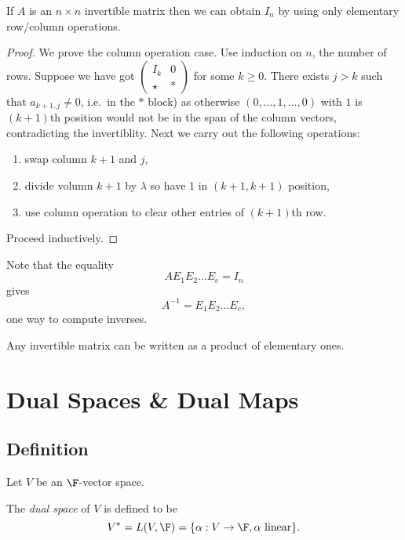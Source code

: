 \documentclass[a4paper]{article}
\theoremstyle{definition}
\begin{document}
\begin{lemma}
  If \(A\) is an \(n\times n\) invertible matrix then we can obtain \(I_n\) by using only elementary row/column operations.
\end{lemma}

\begin{proof}
  We prove the column operation case. Use induction on \(n\), the number of rows. Suppose we have got \(\begin{pmatrix} I_k & 0 \\ \star & \ast \end{pmatrix}\) for some \(k\geq 0\). There exists \(j>k\) such that \(a_{k+1,j}\neq 0\), i.e.\ in the \(\ast\) block) as otherwise \((0,\dots,1,\dots, 0)\) with \(1\) is \((k+1)\)th position would not be in the span of the column vectors, contradicting the invertiblity. Next we carry out the following operations:
  \begin{enumerate}
  \item swap column \(k+1\) and \(j\),
  \item divide volumn \(k+1\) by \(\lambda\) so have \(1\) in \((k+1,k+1)\) position,
  \item use column operation to clear other entries of \((k+1)\)th row.
  \end{enumerate}
  Proceed inductively.
\end{proof}

Note that the equality
\[
  AE_1E_2\dots E_c = I_n
\]
gives
\[
  A^{-1} = E_1E_2\dots E_c,
\]
one way to compute inverses.

\begin{proposition}
  Any invertible matrix can be written as a product of elementary ones.
\end{proposition}

\section{Dual Spaces \& Dual Maps}

\subsection{Definition}

Let \(V\) be an \(\F\)-vector space.

\begin{definition}
  The \emph{dual space} of \(V\) is defined to be
  \[
    V^* = L(V,\F) = \{\alpha:V\to \F, \alpha \text{ linear}\}.
  \]
\end{definition}
\end{document}
